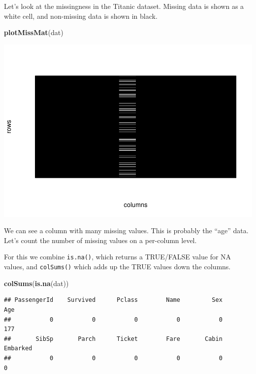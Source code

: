 \documentclass[
]{book}
\newenvironment{Shaded}{\begin{snugshade}}{\end{snugshade}}
\newcommand{\FunctionTok}[1]{\textcolor[rgb]{0.13,0.29,0.53}{\textbf{#1}}}
\newcommand{\NormalTok}[1]{#1}
\begin{document}
Let's look at the missingness in the Titanic dataset. Missing data is shown as a white cell, and non-missing data is shown in black.

\begin{Shaded}
\begin{Highlighting}[]
\FunctionTok{plotMissMat}\NormalTok{(dat)}
\end{Highlighting}
\end{Shaded}

\includegraphics{_main_files/figure-latex/unnamed-chunk-71-1.pdf}

We can see a column with many missing values. This is probably the ``age'' data.
Let's count the number of missing values on a per-column level.

For this we combine \texttt{is.na()}, which returns a TRUE/FALSE value for NA values, and \texttt{colSums()} which adds up the TRUE values down the columns.

\begin{Shaded}
\begin{Highlighting}[]
\FunctionTok{colSums}\NormalTok{(}\FunctionTok{is.na}\NormalTok{(dat))}
\end{Highlighting}
\end{Shaded}

\begin{verbatim}
## PassengerId    Survived      Pclass        Name         Sex         Age 
##           0           0           0           0           0         177 
##       SibSp       Parch      Ticket        Fare       Cabin    Embarked 
##           0           0           0           0           0           0
\end{verbatim}
\end{document}
